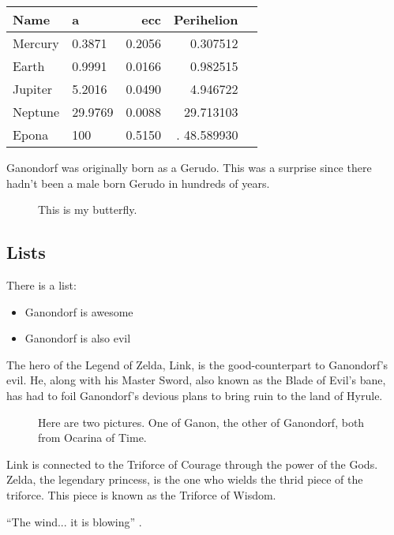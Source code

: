 \documentclass[modern]{aastex63}
\begin{document}
\begin{table}
\begin{tabular}{llrrl}
\toprule

Name &        a &     ecc &  Perihelion \\
\midrule
 Mercury &   0.3871 &  0.2056 &    0.307512 \\
   Earth &   0.9991 &  0.0166 &    0.982515 \\
 Jupiter &   5.2016 &  0.0490 &    4.946722 \\
 Neptune &  29.9769 &  0.0088 &   29.713103 \\
 Epona   &  100     &  0.5150 &.  48.589930\\
\bottomrule
\end{tabular}
\end{table}
\citep{2019arXiv190700991B}

Ganondorf was originally born as a Gerudo. This was a surprise since there hadn't been a male born Gerudo in hundreds of years.

\begin{figure}[ht!]
\caption{This is my butterfly.
\label{fig:general}}
\end{figure}


\subsection{Lists}

There is a list:

\begin{itemize}
    \item Ganondorf is awesome
    \item Ganondorf is also evil
\end{itemize}

The hero of the Legend of Zelda, Link, is the good-counterpart to Ganondorf's evil. He, along with his Master Sword, also known as the Blade of Evil's bane, has had to foil Ganondorf's devious plans to bring ruin to the land of Hyrule. \citep{2004DPS....36.3808W}

\begin{figure}[htb!]
\caption{Here are two pictures. One of Ganon, the other of Ganondorf, both from Ocarina of Time.\label{fig:f2}}
\end{figure}

Link is connected to the Triforce of Courage through the power of the Gods. Zelda, the legendary princess, is the one who wields the thrid piece of the triforce. This piece is known as the Triforce of Wisdom.

``The wind... it is blowing''
 \citep{2019ESRv..19802936H}.
 
\begin{figure}[htb!]
 

\end{figure}



\end{document}
